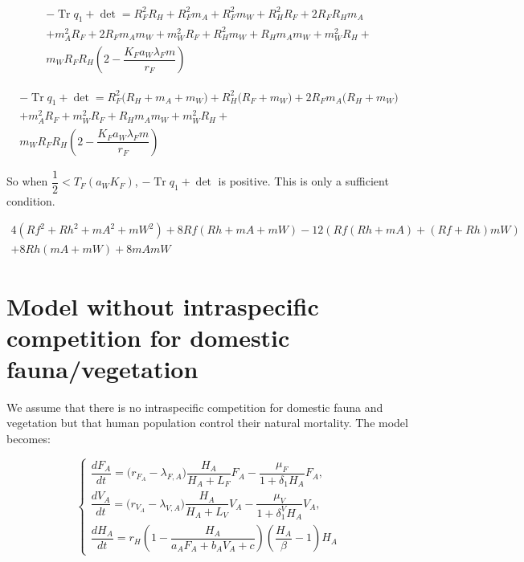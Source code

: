 \documentclass{article}
\newcommand{\lfa}{\lambda_{F, A}}
\newcommand{\lva}{\lambda_{V, A}}
\newcommand{\lfw}{\lambda_{F}}
\DeclareMathOperator{\Tr}{Tr}
\begin{document}
\begin{itemize}
\begin{multline*}
-\Tr q_1 + \det =  R_F^{2} R_H + R_F^{2} m_A + R_F^{2} m_W + R_H^{2} R_F + 2 R_F R_H m_A \\+ m_A^{2} R_F + 2 R_F m_A m_W + m_W^{2} R_F + R_H^{2} m_W + R_H m_A m_W + m_W^{2} R_H +\\ m_W R_F R_H \left(2 - \dfrac{K_F a_W \lfw m}{r_F} \right)
\end{multline*}

\begin{multline*}
-\Tr q_1 + \det =  R_F^{2} \Big(R_H + m_A + m_W\Big) + R_H^{2}\big(R_F+ m_W \Big) + 2 R_F m_A \Big(R_H + m_W\Big) \\+ m_A^{2} R_F + m_W^{2} R_F +  R_H m_A m_W + m_W^{2} R_H +\\ m_W R_F R_H \left(2 - \dfrac{K_F a_W \lfw m}{r_F} \right)
\end{multline*}

So when $\dfrac{1}{2} < T_F(a_WK_F)$, $-\Tr q_1 + \det$ is positive. This is only a sufficient condition.

\end{itemize}

\begin{multline}
4 \left( Rf^{2} + Rh^{2} + mA^{2} + mW^{2} \right) + 8 Rf \left( Rh + mA + mW \right) - 12 \left( Rf \left( Rh + mA \right) + \left( Rf + Rh \right) mW \right) \\ + 8 Rh \left( mA + mW \right) + 8 mA mW
\end{multline}

\section{Model without intraspecific competition for domestic fauna/vegetation}

We assume that there is no intraspecific competition for domestic fauna and vegetation but that human population control their natural mortality. The model becomes:

\begin{equation}
\left\{ \begin{array}{l}
\dfrac{dF_{A}}{dt}= \Big(r_{F_A} - \lfa \Big)  \dfrac{H_A}{H_A+L_F}F_A - \dfrac{\mu_{F}}{1 +\delta_1 H_A}F_A,\\
\dfrac{dV_{A}}{dt}= \Big(r_{V_A} - \lva \Big) \dfrac{H_A}{H_A+L_V}V_A - \dfrac{\mu_{V}}{1 + \delta_1^V H_A}V_A,\\
\dfrac{dH_A}{dt}=r_{H}\left(1-\dfrac{H_A}{a_{A}F_{A} + b_A V_A+ c}\right)\left(\dfrac{H_A}{\beta}-1\right)H_A
\end{array}\right.
\end{equation}
\end{document}

